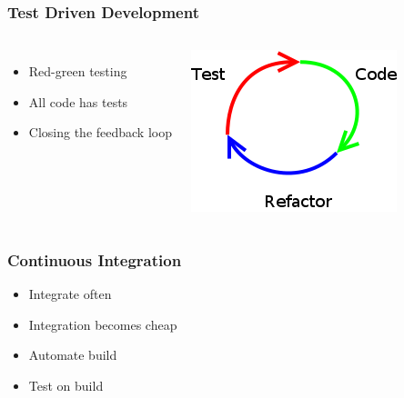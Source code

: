 \begin{frame}
    \frametitle{Test Driven Development}
    \begin{columns}
        \begin{itemize}
            \item Red-green testing
            \item All code has tests
            \item Closing the feedback loop
        \end{itemize}

        \includegraphics[scale=0.5]{tdd_cycle.png}
    \end{columns}
\end{frame}

\begin{frame}
    \frametitle{Continuous Integration}
    \begin{itemize}
        \item Integrate often
        \item Integration becomes cheap
        \item Automate build
        \item Test on build
    \end{itemize}
\end{frame}


